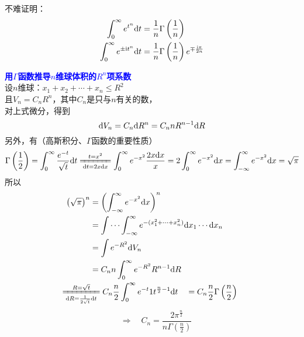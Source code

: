 \documentclass[UTF8,12pt]{ctexart}
\newcommand{\I}{{\rm i}}
\begin{document}
\begin{ebox}
    不难证明：
    \begin{subequations}
        \begin{align}
            \int_0^\infty e^{t^n}{\rm d}t&=\frac{1}{n}\Gamma\left(\frac{1}{n}\right)\\
            \int_0^\infty e^{\pm\I t^n}{\rm d}t&=\frac{1}{n}\Gamma\left(\frac{1}{n}\right)e^{\mp\frac{\I\pi}{2n}}
        \end{align}
    \end{subequations}
\end{ebox}

\begin{ebox}
    \textcolor{blue}{\bf 用$\Gamma$函数推导$n$维球体积的$R^n$项系数\\}
    设$n$维球：$x_1+x_2+\cdots+x_n\leqslant R^2$\\
    且$V_n=C_nR^n$，其中$C_n$是只与$n$有关的数，\\
    对上式微分，得到
    \begin{equation}
        {\rm d}V_n=C_n{\rm d}R^n=C_n n R^{n-1}{\rm d}R
    \end{equation}
    另外，有（高斯积分、$\Gamma$函数的重要性质）
    \begin{equation}
        \Gamma\left(\frac{1}{2}\right)=\int_0^\infty \frac{e^{-t}}{\sqrt{t}}{\rm d}t \xlongequal[{\rm d}t=2x{\rm d}x]{t=x^2} \int_0^\infty e^{-x^2}\frac{2x{\rm d}x}{x}=2\int_0^\infty e^{-x^2}{\rm d}x=\int_{-\infty}^\infty e^{-x^2}{\rm d}x=\sqrt{\pi}
    \end{equation}
    所以\begin{equation}
        \begin{aligned}
            \left(\sqrt{\pi}\right)^n&=\left(\int_{-\infty}^\infty e^{-x^2}{\rm d}x\right)^n\\
            &=\int\cdots\int_{-\infty}^\infty e^{-(x_1^2+\cdots+x_n^2)}{\rm d}x_1\cdots{\rm d}x_n\\
            &=\int e^{-R^2}{\rm d}V_n\\
            &=C_n n\int_0^\infty e^{-R^2}R^{n-1}{\rm d}R\\ 
            &\!\!\!\!\!\!\!\!\!\!\!\!\!\!\!\!\!\!\!\!\!\! 
            \xlongequal[{\rm d}R=\frac{1}{2\sqrt{t}}{\rm d}t]{R=\sqrt{t}}
            C_n \frac{n}{2}\int_0^\infty e^{-t}1t^{\frac{n}{2}-1}{\rm d}t
            \quad=C_n \frac{n}{2}\Gamma\left(\frac{n}{2}\right)\\ 
        \end{aligned}
    \end{equation}
    \begin{equation}
        \quad\Longrightarrow\quad C_n=\frac{2\pi^{\frac{n}{2}}}{n\Gamma\left(\frac{n}{2}\right)}
    \end{equation}
\end{ebox}
\end{document}
